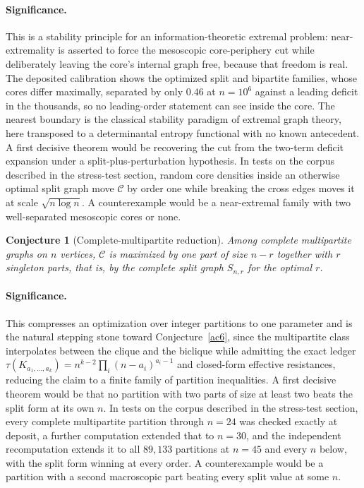 \documentclass[11pt]{article}
\newtheorem{conjecture}{Conjecture}
\theoremstyle{definition}
\begin{document}
\paragraph{Significance.}
This is a stability principle for an information-theoretic extremal problem: near-extremality is asserted to force the mesoscopic core-periphery cut while deliberately leaving the core's internal graph free, because that freedom is real.  The deposited calibration shows the optimized split and bipartite families, whose cores differ maximally, separated by only $0.46$ at $n=10^6$ against a leading deficit in the thousands, so no leading-order statement can see inside the core.  The nearest boundary is the classical stability paradigm of extremal graph theory, here transposed to a determinantal entropy functional with no known antecedent.  A first decisive theorem would be recovering the cut from the two-term deficit expansion under a split-plus-perturbation hypothesis.  In tests on the corpus described in the stress-test section, random core densities inside an otherwise optimal split graph move $\mathcal C$ by order one while breaking the cross edges moves it at scale $\sqrt{n\log n}$.  A counterexample would be a near-extremal family with two well-separated mesoscopic cores or none.

\begin{conjecture}[Complete-multipartite reduction]\label{ac10}
Among complete multipartite graphs on $n$ vertices, $\mathcal C$ is maximized by one part of size $n-r$ together with $r$ singleton parts, that is, by the complete split graph $S_{n,r}$ for the optimal $r$.
\end{conjecture}

\paragraph{Significance.}
This compresses an optimization over integer partitions to one parameter and is the natural stepping stone toward Conjecture~\ref{ac6}, since the multipartite class interpolates between the clique and the biclique while admitting the exact ledger $\tau(K_{a_1,\ldots,a_k})=n^{k-2}\prod_i(n-a_i)^{a_i-1}$ and closed-form effective resistances, reducing the claim to a finite family of partition inequalities.  A first decisive theorem would be that no partition with two parts of size at least two beats the split form at its own $n$.  In tests on the corpus described in the stress-test section, every complete multipartite partition through $n=24$ was checked exactly at deposit, a further computation extended that to $n=30$, and the independent recomputation extends it to all $89{,}133$ partitions at $n=45$ and every $n$ below, with the split form winning at every order.  A counterexample would be a partition with a second macroscopic part beating every split value at some $n$.
\end{document}
